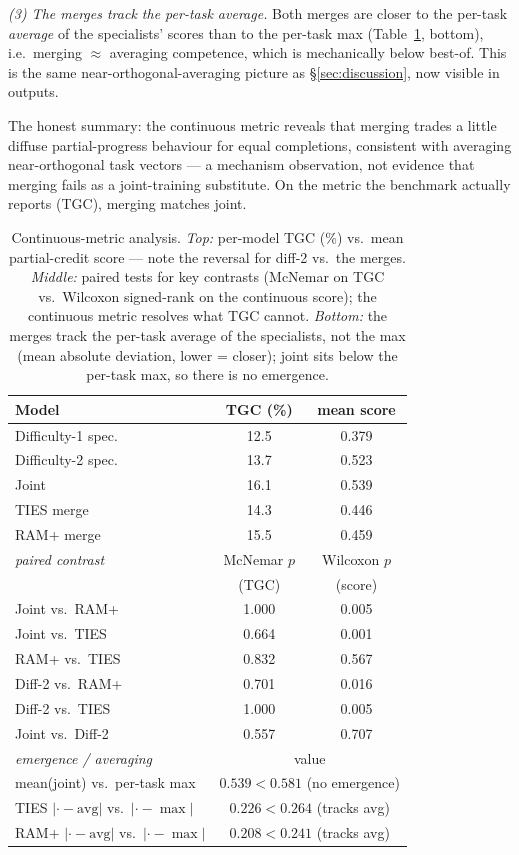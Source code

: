 \documentclass[11pt]{article}
\begin{document}
\emph{(3) The merges track the per-task average.} Both merges are closer to the per-task
\emph{average} of the specialists' scores than to the per-task max
(Table~\ref{tab:metric}, bottom), i.e.\ merging $\approx$ averaging competence, which is
mechanically below best-of. This is the same near-orthogonal-averaging picture as
\S\ref{sec:discussion}, now visible in outputs.

The honest summary: the continuous metric reveals that merging trades a little diffuse
partial-progress behaviour for equal completions, consistent with averaging
near-orthogonal task vectors --- a mechanism observation, not evidence that merging fails
as a joint-training substitute. On the metric the benchmark actually reports (TGC),
merging matches joint.

\begin{table}[t]
\centering
\caption{Continuous-metric analysis. \emph{Top:} per-model TGC (\%) vs.\ mean partial-credit
score --- note the reversal for diff-2 vs.\ the merges. \emph{Middle:} paired tests for key
contrasts (McNemar on TGC vs.\ Wilcoxon signed-rank on the continuous score); the
continuous metric resolves what TGC cannot. \emph{Bottom:} the merges track the per-task
average of the specialists, not the max (mean absolute deviation, lower = closer);
joint sits below the per-task max, so there is no emergence.}
\label{tab:metric}
\small
\begin{tabular}{lcc}
\toprule
Model & TGC (\%) & mean score \\
\midrule
Difficulty-1 spec. & 12.5 & 0.379 \\
Difficulty-2 spec. & 13.7 & 0.523 \\
Joint              & 16.1 & 0.539 \\
TIES merge         & 14.3 & 0.446 \\
RAM+ merge         & 15.5 & 0.459 \\
\midrule
\emph{paired contrast} & McNemar $p$ & Wilcoxon $p$ \\
 & (TGC) & (score) \\
Joint vs.\ RAM+       & 1.000 & 0.005 \\
Joint vs.\ TIES       & 0.664 & 0.001 \\
RAM+ vs.\ TIES        & 0.832 & 0.567 \\
Diff-2 vs.\ RAM+      & 0.701 & 0.016 \\
Diff-2 vs.\ TIES      & 1.000 & 0.005 \\
Joint vs.\ Diff-2     & 0.557 & 0.707 \\
\midrule
\emph{emergence / averaging} & \multicolumn{2}{c}{value} \\
mean(joint) vs.\ per-task max & \multicolumn{2}{c}{$0.539 < 0.581$ (no emergence)} \\
TIES $|{\cdot}\!-\!\mathrm{avg}|$ vs.\ $|{\cdot}\!-\!\max|$ & \multicolumn{2}{c}{$0.226 < 0.264$ (tracks avg)} \\
RAM+ $|{\cdot}\!-\!\mathrm{avg}|$ vs.\ $|{\cdot}\!-\!\max|$ & \multicolumn{2}{c}{$0.208 < 0.241$ (tracks avg)} \\
\bottomrule
\end{tabular}
\end{table}
\end{document}
